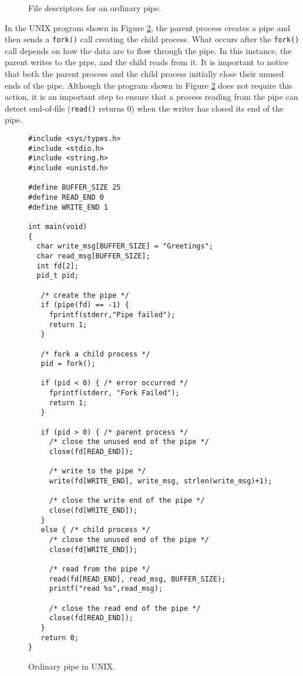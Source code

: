 \begin{figure}[h!]
\centering
\caption{File descriptors for an ordinary pipe.}\label{fig:unix-pipe-fds}
\end{figure}

In the UNIX program shown in Figure \ref{fig:unix-ordinary-pipe}, the parent process creates a pipe and then sends a \texttt{fork()} call creating the child process. What occurs after the \texttt{fork()} call depends on how the data are to flow through the pipe. In this instance, the parent writes to the pipe, and the child reads from it. It is important to notice that both the parent process and the child process initially close their unused ends of the pipe. Although the program shown in Figure \ref{fig:unix-ordinary-pipe} does not require this action, it is an important step to ensure that a process reading from the pipe can detect end-of-file (\texttt{read()} returns 0) when the writer has closed its end of the pipe.

\begin{figure}[h!]
\centering
\begin{verbatim}
#include <sys/types.h>
#include <stdio.h>
#include <string.h>
#include <unistd.h>
 
#define BUFFER_SIZE 25
#define READ_END 0
#define WRITE_END 1
 
int main(void)
{
  char write_msg[BUFFER_SIZE] = "Greetings";
  char read_msg[BUFFER_SIZE];
  int fd[2];
  pid_t pid;

   /* create the pipe */
   if (pipe(fd) == -1) {
     fprintf(stderr,"Pipe failed");
     return 1;
   }
 
   /* fork a child process */
   pid = fork();
 
   if (pid < 0) { /* error occurred */
     fprintf(stderr, "Fork Failed");
     return 1;
   }
 
   if (pid > 0) { /* parent process */
     /* close the unused end of the pipe */
     close(fd[READ_END]);
 
     /* write to the pipe */
     write(fd[WRITE_END], write_msg, strlen(write_msg)+1);
 
     /* close the write end of the pipe */
     close(fd[WRITE_END]);
   }
   else { /* child process */
     /* close the unused end of the pipe */
     close(fd[WRITE_END]);
 
     /* read from the pipe */
     read(fd[READ_END], read_msg, BUFFER_SIZE);
     printf("read %s",read_msg);
 
     /* close the read end of the pipe */
     close(fd[READ_END]);
   }
   return 0;
}
\end{verbatim}
\caption{Ordinary pipe in UNIX.}\label{fig:unix-ordinary-pipe}
\end{figure}


